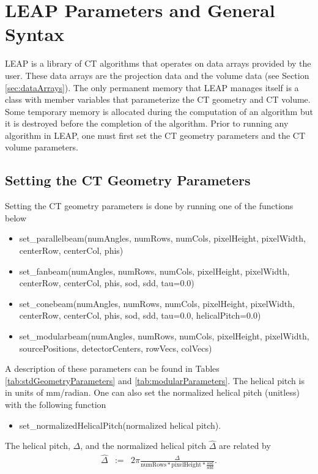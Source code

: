 \documentclass[11pt]{article}
\begin{document}
\section{LEAP Parameters and General Syntax}

LEAP is a library of CT algorithms that operates on data arrays provided by the user.  These data arrays are the projection data and the volume data (see Section \ref{sec:dataArrays}).  The only permanent memory that LEAP manages itself is a class with member variables that parameterize the CT geometry and CT volume.  Some temporary memory is allocated during the computation of an algorithm but it is destroyed before the completion of the algorithm.  Prior to running any algorithm in LEAP, one must first set the CT geometry parameters and the CT volume parameters.

\subsection{Setting the CT Geometry Parameters}

Setting the CT geometry parameters is done by running one of the functions below
\begin{itemize}
\item[] set\_parallelbeam(numAngles, numRows, numCols, pixelHeight, pixelWidth, centerRow, centerCol, phis)
\item[] set\_fanbeam(numAngles, numRows, numCols, pixelHeight, pixelWidth, centerRow, centerCol, phis, sod, sdd, tau=0.0)
\item[] set\_conebeam(numAngles, numRows, numCols, pixelHeight, pixelWidth, centerRow, centerCol, phis, sod, sdd, tau=0.0, helicalPitch=0.0)
\item[] set\_modularbeam(numAngles, numRows, numCols, pixelHeight, pixelWidth, sourcePositions, detectorCenters, rowVecs, colVecs)
\end{itemize}
A description of these parameters can be found in Tables \ref{tab:stdGeometryParameters} and \ref{tab:modularParameters}.  The helical pitch is in units of mm/radian.  One can also set the normalized helical pitch (unitless) with the following function
\begin{itemize}
    \item[] set\_normalizedHelicalPitch(normalized helical pitch).
\end{itemize}
The helical pitch, $\Delta$, and the normalized helical pitch $\widehat{\Delta}$ are related by
\begin{eqnarray*}
\widehat{\Delta} &:=& 2\pi \frac{\Delta}{\text{numRows} * \text{pixelHeight} * \frac{\text{sod}}{\text{sdd}}}.
\end{eqnarray*}
\end{document}
